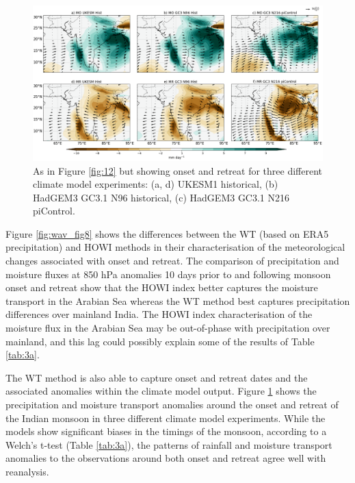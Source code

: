 \begin{figure}[t!]
\centering
 \includegraphics[width=\linewidth]{figures/ind_models.png}
\caption[Indian monsoon precipitation anomalies associated with onset]{ As in Figure \ref{fig:12} but showing onset and retreat for three different climate model experiments: (a, d) UKESM1 historical, (b) HadGEM3 GC3.1 N96 historical, (c) HadGEM3 GC3.1 N216 piControl.   }
\label{fig:indmodels}
\end{figure}

Figure \ref{fig:wav_fig8} shows the differences between the WT (based on ERA5 precipitation) and HOWI methods in their characterisation of the meteorological changes associated with onset and retreat. 
The comparison of precipitation and moisture fluxes at 850 hPa anomalies 10 days prior to and following monsoon onset and retreat show that the HOWI index better captures the moisture transport in the Arabian Sea whereas the WT method best captures precipitation differences over mainland India. The HOWI index characterisation of the moisture flux in the Arabian Sea may be out-of-phase with precipitation over mainland, and this lag could possibly explain some of the results of Table \ref{tab:3a}.


 The WT method is also able to capture onset and retreat dates and the associated anomalies within the climate model output. Figure \ref{fig:indmodels} shows the precipitation and moisture transport anomalies around the onset and retreat of the Indian monsoon in three different climate model experiments. While the models show significant biases in the timings of the monsoon, according to a Welch's t-test (Table \ref{tab:3a}), the patterns of rainfall and moisture transport anomalies to the observations around both onset and retreat agree well with reanalysis.

